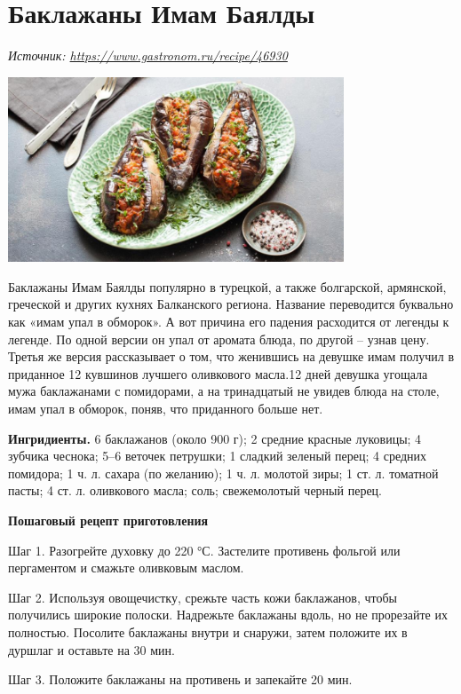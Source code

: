 \newpage
\section{Баклажаны Имам Баялды}


 {\it Источник: \url{https://www.gastronom.ru/recipe/46930}}

\includegraphics[width=0.75\textwidth]{img/baildi.jpg}

Баклажаны Имам Баялды популярно в турецкой, а также болгарской, армянской, греческой и других кухнях Балканского региона. Название переводится буквально как «имам упал в обморок». А вот причина его падения расходится от легенды к легенде. По одной версии он упал от аромата блюда, по другой – узнав цену. Третья же версия рассказывает о том, что женившись на девушке имам получил в приданное 12 кувшинов лучшего оливкового масла.12 дней девушка угощала мужа баклажанами с помидорами, а на тринадцатый не увидев блюда на столе, имам упал в обморок, поняв, что приданного больше нет.

\textbf{Ингридиенты.} 6 баклажанов (около 900 г);
2 средние красные луковицы;
4 зубчика чеснока;
5–6 веточек петрушки;
1 сладкий зеленый перец;
4 средних помидора;
1 ч. л. сахара (по желанию);
1 ч. л. молотой зиры;
1 ст. л. томатной пасты;
4 ст. л. оливкового масла;
соль;
свежемолотый черный перец.

\textbf{Пошаговый рецепт приготовления}

Шаг 1. Разогрейте духовку до 220 °С. Застелите противень фольгой или пергаментом и смажьте оливковым маслом.

Шаг 2. Используя овощечистку, срежьте часть кожи баклажанов, чтобы получились широкие полоски. Надрежьте баклажаны вдоль, но не прорезайте их полностью. Посолите баклажаны внутри и снаружи, затем положите их в дуршлаг и оставьте на 30 мин.

Шаг 3. Положите баклажаны на противень и запекайте 20 мин.

